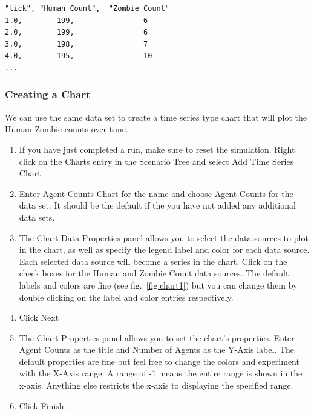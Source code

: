 \documentclass[11pt]{amsart}
\begin{document}
\noindent\begin{minipage}[h]{\textwidth}
\vspace{.2in}
\lstset{language=java,caption=Zombie Model Output}
\begin{lstlisting}
"tick",	"Human Count",	"Zombie Count"
1.0,		199,				6
2.0,		199,				6
3.0,		198,				7
4.0,		195,				10
...
\end{lstlisting}
\vspace{.2in}
\end{minipage}

\subsubsection{Creating a Chart} 
We can use the same data set to create a time series type chart that will plot the Human Zombie counts over time. 

\vspace{.2in}
\begin{enumerate}
\item If you have just completed a run, make sure to reset the simulation. Right click on the Charts entry in the Scenario Tree and select Add Time Series Chart.
\item Enter Agent Counts Chart for the name and choose Agent Counts for the data set. It should be the default if the you have not added any additional data sets.
\item The Chart Data Properties panel allows you to select the data sources to plot in the chart, as well as specify the legend label and color for each data source. Each selected data source will become a series in the chart. Click on the check boxes for the Human and Zombie Count data sources. The default labels and colors are fine (see fig.~\ref{fig:chart1}) but you can change them by double clicking on the label and color entries respectively.
\item Click Next
\item The Chart Properties panel allows you to set the chart's properties. Enter Agent Counts as the title and Number of Agents as the Y-Axis label. The default properties are fine but feel free to change the colors and experiment with the X-Axis range. A range of -1 means the entire range is shown in the x-axis. Anything else restricts the x-axis to displaying the specified range.
\item Click Finish.
\end{enumerate}
\vspace{.2in}
\end{document}
